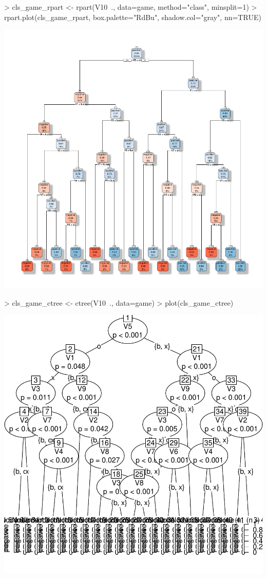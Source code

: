 \documentclass [a4paper] {article}
\begin{document}
\begin{center}
\begin{Schunk}
\begin{Sinput}
> cls_game_rpart <- rpart(V10~., data=game, method="class", minsplit=1)
> rpart.plot(cls_game_rpart, box.palette="RdBu", shadow.col="gray", nn=TRUE)
\end{Sinput}
\end{Schunk}
\includegraphics{entrega-analisis_juego_rpart}
\begin{Schunk}
\begin{Sinput}
> cls_game_ctree <- ctree(V10~., data=game)
> plot(cls_game_ctree)
\end{Sinput}
\end{Schunk}
\includegraphics{entrega-analisis_juego_ctree}
\end{center}
\end{document}
